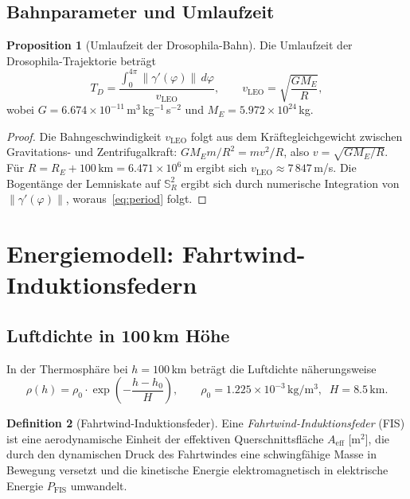 ﻿\documentclass[a4paper,12pt]{article}
\theoremstyle{definition}
\newtheorem{definition}{Definition}[section]
\newtheorem{proposition}[definition]{Proposition}
\begin{document}
\subsection{Bahnparameter und Umlaufzeit}

\begin{proposition}[Umlaufzeit der Drosophila-Bahn]
\label{prop:period}
Die Umlaufzeit der Drosophila-Trajektorie betr\"agt
\begin{equation}
  T_D = \frac{\int_0^{4\pi} \|\gamma'(\varphi)\|\,d\varphi}{v_{\mathrm{LEO}}},
  \qquad v_{\mathrm{LEO}} = \sqrt{\frac{GM_E}{R}},
  \label{eq:period}
\end{equation}
wobei $G = 6.674\times10^{-11}$\,m$^3$\,kg$^{-1}$\,s$^{-2}$
und $M_E = 5.972\times10^{24}$\,kg.
\end{proposition}

\begin{proof}
Die Bahngeschwindigkeit $v_{\mathrm{LEO}}$ folgt aus dem Kr\"aftegleichgewicht
zwischen Gravita\-tions- und Zentrifugalkraft:
$GM_E m / R^2 = m v^2 / R$, also $v = \sqrt{GM_E / R}$.
F\"ur $R = R_E + 100\,\mathrm{km} = 6.471\times10^6$\,m ergibt sich
$v_{\mathrm{LEO}} \approx 7\,847$\,m/s.
Die Bogent\"ange der Lemniskate auf $\mathbb{S}^2_R$ ergibt sich durch
numerische Integration von $\|\gamma'(\varphi)\|$, woraus~\eqref{eq:period} folgt.
\end{proof}

\section{Energiemodell: Fahrtwind-Induktionsfedern}
\label{sec:energy}

\subsection{Luftdichte in 100\,km H\"ohe}

In der Thermosph\"are bei $h = 100$\,km betr\"agt die Luftdichte
n\"aherungsweise
\begin{equation}
  \rho(h) = \rho_0 \cdot \exp\!\left(-\frac{h - h_0}{H}\right),
  \qquad \rho_0 = 1.225 \times 10^{-3}\,\mathrm{kg/m^3},\;\;
  H = 8.5\,\mathrm{km}.
  \label{eq:density}
\end{equation}

\begin{definition}[Fahrtwind-Induktionsfeder]
Eine \emph{Fahrtwind-Induktionsfeder} (FIS) ist eine aerodynamische
Einheit der effektiven Querschnittsfl\"ache $A_{\mathrm{eff}}$ [m$^2$],
die durch den dynamischen Druck des Fahrtwindes eine schwingf\"ahige
Masse in Bewegung versetzt und die kinetische Energie elektromagnetisch
in elektrische Energie $P_{\mathrm{FIS}}$ umwandelt.
\end{definition}
\end{document}

